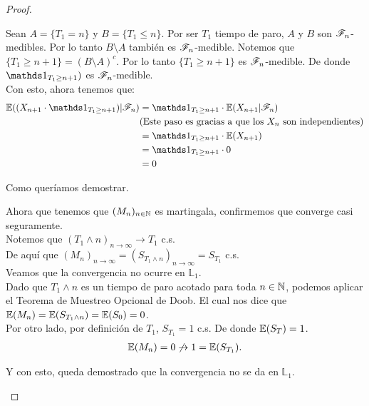 \begin{proof}
\begin{enumerate}
\begin{itemize}
					Sean $A = \{T_1 = n\}$ y $B = \{ T_1 \leq n\}$. Por ser $T_1$ tiempo de paro,
					$A$ y $B$ son $\mathscr{F}_n$-medibles. Por lo tanto $B \setminus A$ también es $\mathscr{F}_n$-medible. 
					Notemos que $\{T_1 \geq n+1\} = (B \setminus A)^c$. Por lo tanto $\{T_1 \geq n+1\}$ es
					$\mathscr{F}_n$-medible. De donde  $\indic_{T_1 \geq n+1})$ es $\mathscr{F}_n$-medible.\\
					
					Con esto, ahora tenemos que:
					\begin{align}
						\E((X_{n+1} \cdot \indic_{T_1 \geq n+1}) | \F_{n}) &= \indic_{T_1 \geq n+1} \cdot \E(X_{n+1} | \F_{n}) \\
						&\mbox{(Este paso es gracias a que los $X_n$ son independientes)} \\
						&=\indic_{T_1 \geq n+1} \cdot \E(X_{n+1} ) \\
						&=\indic_{T_1 \geq n+1} \cdot 0 \\
						&= 0
					\end{align}	
					
					Como queríamos demostrar.
			\end{itemize}
			
			Ahora que tenemos que $(M_n)_{n \in \mathbb{N}}$ es martingala, confirmemos que converge casi seguramente.\\
			
			Notemos que $(T_1 \wedge n)_{n \rightarrow \infty} \rightarrow T_1$ c.s.\\
			
			De aquí que $(M_n)_{n \rightarrow \infty} = (S_{T_1 \wedge n})_{n \rightarrow \infty} = S_{T_1}$ c.s. \\				
			
			Veamos que la convergencia no ocurre en $\mathbb{L}_1$. \\
						
			Dado que $T_1 \wedge n$ es un tiempo de paro acotado para toda $n \in \mathbb{N}$,
			podemos aplicar el Teorema de Muestreo Opcional de 	Doob. 
			El cual nos dice que $\mathbb{E}(M_n) = \mathbb{E}(S_{T_1 \wedge n}) = \mathbb{E}(S_0) = 0$.\\
			
			Por otro lado, por definición de $T_1$, $S_{T_1} = 1$ c.s.	De donde $\mathbb{E}(S_T) = 1$.\\
			
			\begin{align}
				\mathbb{E}(M_n) = 0 \not\rightarrow 1 = \mathbb{E}(S_{T_1}).
			\end{align}			
			
			Y con esto, queda demostrado que la convergencia no se da en $\mathbb{L}_1$.\\
			

\end{enumerate}
\end{proof}
